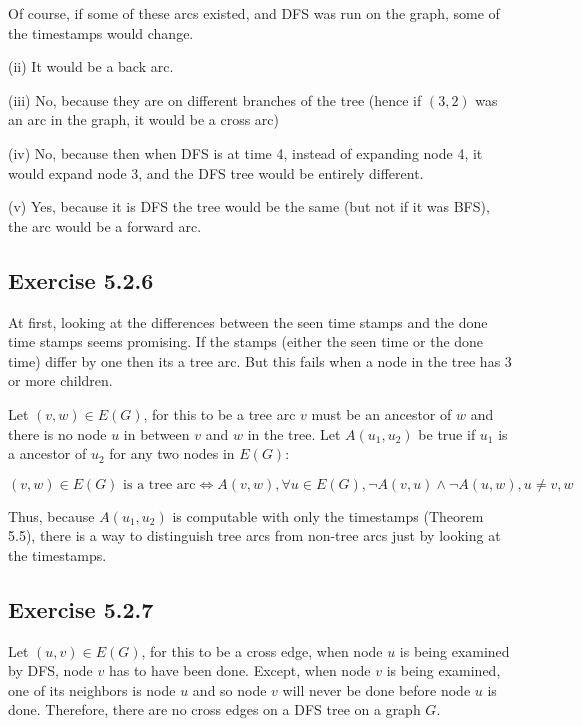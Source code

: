 \documentclass{article}
\begin{document}
Of course, if some of these arcs existed, and DFS was run on the graph, some of the timestamps would change.
\newline \newline

(ii) It would be a back arc.
\newline \newline

(iii) No, because they are on different branches of the tree (hence if \((3,2)\) was an arc in the graph, it would be a cross arc)
\newline \newline

(iv) No, because then when DFS is at time 4, instead of expanding node 4, it would expand node 3, and the DFS tree would be entirely different.
\newline \newline

(v) Yes, because it is DFS the tree would be the same (but not if it was BFS), the arc would be a forward arc.


\subsection*{Exercise 5.2.6}

At first, looking at the differences between the seen time stamps and the done time stamps seems promising. If the stamps (either the seen time or the done time) differ by one then its a tree arc. But this fails when a node in the tree has 3 or more children.

Let \((v,w) \in E(G)\), for this to be a tree arc \(v\) must be an ancestor of \(w\) and there is no node \(u\) in between \(v\) and \(w\) in the tree. Let \(A(u_1,u_2)\) be true if \(u_1\) is a ancestor of \(u_2\) for any two nodes in \(E(G)\):

\[(v,w) \in E(G) \text{ is a tree arc} \iff A(v,w), \forall u \in E(G), \neg A(v,u) \wedge \neg A(u,w), u \neq v,w \]

Thus, because \(A(u_1,u_2)\) is computable with only the timestamps (Theorem 5.5), there is a way to distinguish tree arcs from non-tree arcs just by looking at the timestamps.


\subsection*{Exercise 5.2.7}

Let \((u,v) \in E(G)\), for this to be a cross edge, when node \(u\) is being examined by DFS, node \(v\) has to have been done. Except, when node \(v\) is being examined, one of its neighbors is node \(u\) and so node \(v\) will never be done before node \(u\) is done. Therefore, there are no cross edges on a DFS tree on a graph \(G\).
\end{document}
